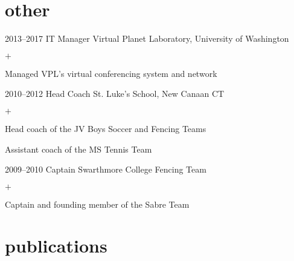 \documentclass[]{luger-cv} %
\begin{document}

\section{other}

\begin{entrylist}


\entry
{2013--2017}
{IT Manager}
{Virtual Planet Laboratory, University of Washington}
{%
\vspace{-1em}
\begin{list}{$+$}{\cvlist}
\item Managed VPL's virtual conferencing system and network
\end{list}
}


\entry
{2010--2012}
{Head Coach}
{St. Luke's School, New Canaan CT}
{%
\vspace{-1em}
\begin{list}{$+$}{\cvlist}
\item Head coach of the JV Boys Soccer and Fencing Teams
\item Assistant coach of the MS Tennis Team
\end{list}
}


\entry
{2009--2010}
{Captain}
{Swarthmore College Fencing Team}
{%
\vspace{-1em}
\begin{list}{$+$}{\cvlist}
\item Captain and founding member of the Sabre Team
\end{list}
}


\end{entrylist}


\ifdefined\withpubs
    \section{publications}
    \begin{center}\\\end{center}
    \vspace*{0.2em}
    \citearrow
    \begin{list}{}{\pubslist}
        
    \end{list}
\fi
\end{document}
